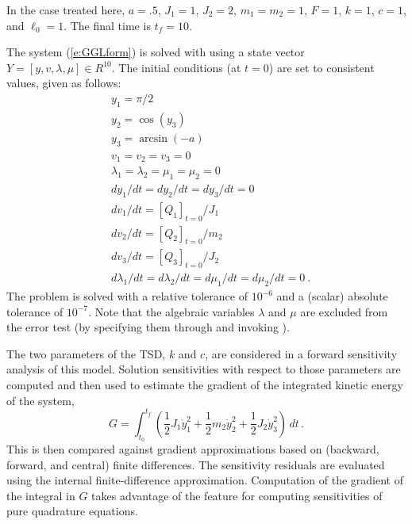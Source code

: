 In the case treated here, $a = .5$, $J_1 = 1$, $J_2 = 2$, $m_1 = m_2 = 1$,
$F = 1$, $k = 1$, $c = 1$, and $\ell_0 = 1$. The final time is $t_f = 10$.

The system (\ref{e:GGLform}) is solved with {\idas} using a state vector
$Y = [y, v, \lambda, \mu] \in R^{10}$.   The initial conditions (at $t = 0$)
are set to consistent values, given as follows:
\begin{equation*}
  \begin{split}
    &y_1 = \pi/2 \\
    &y_2 = \cos(y_3) \\
    &y_3 = \arcsin(-a) \\
    &v_1 = v_2 = v_3 = 0 \\
    &\lambda_1 = \lambda_2 = \mu_1 = \mu_2 = 0 \\
    &dy_1/dt = dy_2/dt = dy_3/dt = 0 \\
    &dv_1/dt = \left[Q_1\right]_{t=0} / J_1 \\
    &dv_2/dt = \left[Q_2\right]_{t=0} / m_2 \\
    &dv_3/dt = \left[Q_3\right]_{t=0} / J_2 \\
    &d\lambda_1/dt = d\lambda_2/dt = d\mu_1/dt = d\mu_2/dt = 0 ~.
  \end{split}
\end{equation*}
The problem is solved with a relative tolerance of $10^{-6}$ and a (scalar) absolute
tolerance of $10^{-7}$. Note that the algebraic variables $\lambda$ and $\mu$ are
excluded from the error test (by specifying them through  and invoking
).

The two parameters of the TSD, $k$ and $c$, are considered in a forward
sensitivity analysis of this model. Solution sensitivities with respect
to those parameters are computed and then used to estimate the gradient
of the integrated kinetic energy of the system,
\begin{equation}
  G = \int_{t_0}^{t_f} \left(    
    \frac{1}{2} J_1 \dot y_1^2 + \frac{1}{2} m_2 \dot y_2^2 + \frac{1}{2} J_2 \dot y_3^2 \right) \, dt \, .
\end{equation}
This is then compared against gradient approximations based on (backward, forward, and central)
finite differences.  The sensitivity residuals are evaluated using the {\idas} internal
finite-difference approximation.  Computation of the gradient of the integral in $G$ takes
advantage of the {\idas} feature for computing sensitivities of pure quadrature equations.


